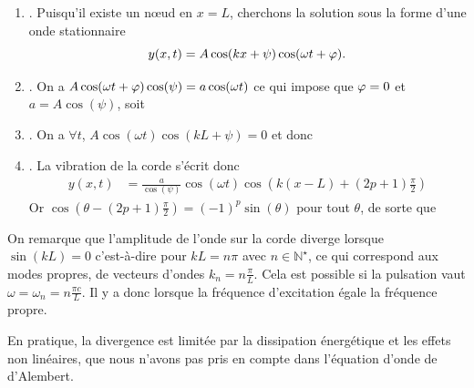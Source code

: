 \documentclass[12pt,fancy]{cours}
\begin{document}
\begin{demo}
  \textsl{}
  \begin{enumerate}
    \item {}.
 Puisqu'il existe un nœud en $x=L$, cherchons la solution sous la forme d'une onde stationnaire
\begin{equation}
  y(x,t)=A\cos(kx+\psi)\cos(\omega t+\varphi).
\end{equation}
  \item {}. On a $A\cos(\omega t+\varphi)\cos(\psi)=a\cos(\omega t)$ ce qui impose que $\varphi=0$ et $a=A\cos(\psi)$, soit 
  \item {}. On a  $\forall t$, $A\cos(\omega t)\cos(kL+\psi)=0$ et donc 
    \item {}.
    La vibration de la corde s’écrit donc
    \begin{equation}
      \begin{split}
        y(x,t)&=\frac{a}{\cos(\psi)}
        \cos(\omega t){\cos(k(x-L)+(2p+1)\frac{\pi}{2})}
      \end{split}
    \end{equation}
    Or $\cos(\theta-(2p+1)\frac{\pi}{2})=(-1)^{p}\sin(\theta)$  pour tout $\theta$, de sorte que
    \end{enumerate}
      On remarque que l'amplitude de l'onde sur la corde diverge lorsque $\sin(kL)=0$ c'est-à-dire pour $kL=n\pi$ avec $n\in\mathbb{N}^{\star}$, ce qui correspond aux modes propres, de vecteurs d'ondes $k_n = n \frac{\pi}{L}$. Cela est possible si la pulsation vaut $\omega=\omega_n=n\frac{\pi c}{L}$. Il y a donc  lorsque la fréquence d’excitation égale la fréquence propre.
\end{demo}

  \begin{remarque}
  En pratique, la divergence est limitée par la dissipation énergétique et les effets non linéaires, que nous n'avons pas pris en compte dans l'équation d'onde de d'Alembert.
  \end{remarque}
\end{document}
